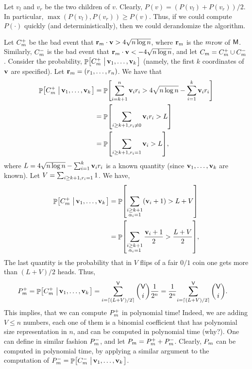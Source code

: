Let $v_l$ and $v_r$ be the two children of $v$.
Clearly, $P(v) = (P(v_l) + P(v_r))/2$. In particular, $\max( P(v_l),
P(v_r)) \geq P(v)$. Thus, if we could compute $P(\cdot)$ quickly (and
deterministically), then we could derandomize the algorithm.


Let $C_m^+$ be the bad event that
$\mathbf{r}_m \cdot \mathbf{v} > 4 \sqrt{n \log n}$, where $\mathbf{r}_m$ is the
$m$\th row of $\mathsf{M}$.  Similarly, $C_m^-$ is the bad event
that $\mathbf{r}_m \cdot \mathbf{v} < -4 \sqrt{n \log{n}}$, and let
$C_m = C_m^+ \cup C_m^-$.  Consider the probability,
$\Prob{C_\ind^+ \sep{\vecA_1, \ldots, \vecA_k}}$ (namely, the first
$k$ coordinates of $\mathbf{v}$ are specified).  Let
$\mathbf{r}_m = ({r}_1,\ldots, {r}_n)$.  We have that
\begin{align*}
    \Prob{C_\ind^+ \sep{\vecA_1, \ldots, \vecA_k}}%
    &=
    \Prob{\sum_{i=k+1}^{n} \vecA_i \rowc_i > 4 \sqrt{n \log{n}} -
       \sum_{i=1}^{k} \vecA_i \rowc_i }%
    \\&=%
    \Prob{\sum_{i \geq k+1, \rowc_i \ne 0 } \vecA_i \rowc_i >
       L}%
    \\&=%
    \Prob{\sum_{i \geq k+1, \rowc_i = 1 } \vecA_i > L},
\end{align*}
where
\begin{math}
    L = 4 \sqrt{n \log{n}} - \sum_{i=1}^{k} \mathbf{v}_i {r}_i
\end{math}
is a known quantity (since $\mathbf{v}_1, \ldots, \mathbf{v}_k$ are known). Let
$V = \sum_{i \geq k+1, {r}_i =1 } 1$. We have,
\begin{align*}
  \Prob{C_\ind^+ \sep{\vecA_1, \ldots, \vecA_k}} 
  &=%
    \Prob{\sum_{\substack{i \geq k+1\\ \alpha_i = 1}}\pth{ \vecA_i +
  1} > L + V}%
  \\&=%
  \Prob{\sum_{\substack{i \geq k+1\\ \alpha_i = 1} }\frac{{ \vecA_i +
  1}}{2} > \frac{L + V}{2}},
\end{align*}
The last quantity is the probability that in $V$ flips of a fair $0/1$
coin one gets more than $(L+V)/2$ heads. Thus,
\begin{align*}
  P_\ind^+ = \Prob{C_\ind^+ \sep{\vecA_1, \ldots, \vecA_k}} &=%
                                                              \sum_{i = \ceil{(L+V)/2}}^{\Vertices} \binom{\Vertices}{i}
                                                              \frac{1}{2^n}%
                                                              =%
                                                              \frac{1}{2^n} { \sum_{i = \ceil{(L+V)/2}}^{\Vertices}
                                                              \binom{\Vertices}{i}}.
\end{align*}
This implies, that we can compute $P_m^+$ in polynomial
time!  Indeed, we are adding $V \leq n$ numbers, each one of
them is a binomial coefficient that has polynomial size
representation in $n$, and can be computed in polynomial
time (why?).  One can define in similar fashion $P_m^-$, and
let $P_m = P_m^+ + P_m^-$. Clearly, $P_m$ can be computed in
polynomial time, by applying a similar argument to the
computation of $P_\ind^- = \Prob{C_\ind^- \sep{\vecA_1, \ldots,
      \vecA_k}}$.


